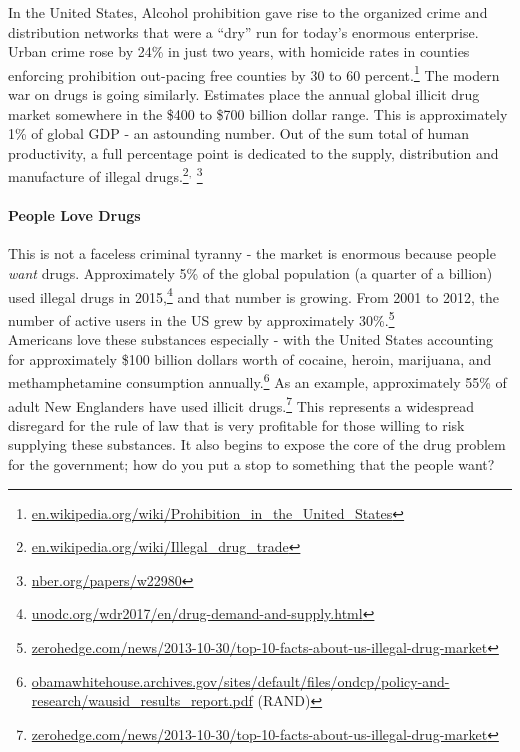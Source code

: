 \documentclass[12pt]{article}
\begin{document}
In the United States, Alcohol prohibition gave rise to the organized crime and distribution networks that were a ``dry'' run for today's enormous enterprise. Urban crime rose by 24\% in just two years, with homicide rates in counties enforcing prohibition out-pacing free counties by 30 to 60 percent.\footnote{\url{en.wikipedia.org/wiki/Prohibition_in_the_United_States}} The modern war on drugs is going similarly. Estimates place the annual global illicit drug market somewhere in the \$400 to \$700 billion dollar range. This is approximately 1\% of global GDP - an astounding number. Out of the sum total of human productivity, a full percentage point is dedicated to the supply, distribution and manufacture of illegal drugs.\footnote{\url{en.wikipedia.org/wiki/Illegal_drug_trade}}$^,$ \footnote{\url{nber.org/papers/w22980}}

\paragraph{People Love Drugs} This is not a faceless criminal tyranny - the market is enormous because people \emph{want} drugs. Approximately 5\% of the global population (a quarter of a billion) used illegal drugs 
in 2015,\footnote{\url{unodc.org/wdr2017/en/drug-demand-and-supply.html}} and that number is growing. From 2001 to 2012, the number of active users in the US grew by approximately 
30\%.\footnote{\url{zerohedge.com/news/2013-10-30/top-10-facts-about-us-illegal-drug-market}}
\\

Americans love these substances especially - with the United States accounting for 
approximately \$100 billion dollars worth of cocaine, 
heroin, marijuana, and methamphetamine consumption
annually.\footnote{\url{obamawhitehouse.archives.gov/sites/default/files/ondcp/policy-and-research/wausid_results_report.pdf} (RAND)}
As an example, approximately 55\% of adult New Englanders have used illicit drugs.\footnote{\url{zerohedge.com/news/2013-10-30/top-10-facts-about-us-illegal-drug-market}} This represents a widespread disregard for the rule of law that is very profitable for those willing to risk supplying these substances. It also begins to expose the core of the drug problem for the government; how do you put a stop to something that the people want?

\clearpage
\end{document}
